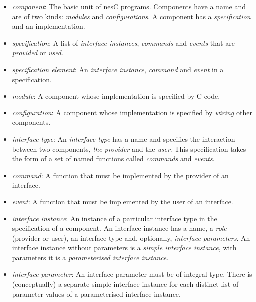 \documentclass[11pt]{article}
\newcommand{\nesc}{nesC\xspace}
\begin{document}
\begin{itemize}

\item \emph{component}: The basic unit of \nesc programs. Components have a
name and are of two kinds: \emph{modules} and \emph{configurations}. A
component has a \emph{specification} and an implementation. 

\item \emph{specification}: A list of \emph{interface instances},
\emph{commands} and \emph{events} that are \emph{provided} or \emph{used}.

\item \emph{specification element}: An \emph{interface instance},
\emph{command} and \emph{event} in a specification.

\item \emph{module}: A component whose implementation is specified by C code. 

\item \emph{configuration}: A component whose implementation is specified
by \emph{wiring} other components.

\item \emph{interface type}: An \emph{interface type} has a name and
specifies the interaction between two components, \emph{the provider} and
the \emph{user}. This specification takes the form of a set of named
functions called \emph{commands} and \emph{events}.

\item \emph{command}: A function that must be implemented by the provider
of an interface.

\item \emph{event}: A function that must be implemented by the user of
an interface.


\item \emph{interface instance}: An instance of a particular interface type
in the specification of a component. An interface instance has a name, a
\emph{role} (provider or user), an interface type and, optionally,
\emph{interface parameters}. An interface instance without parameters is
a \emph{simple interface instance}, with parameters it is a
\emph{parameterised interface instance}.

\item \emph{interface parameter}: An interface parameter must be of
integral type. There is (conceptually) a separate simple interface instance
for each distinct list of parameter values of a parameterised interface
instance.


\end{itemize}
\end{document}
